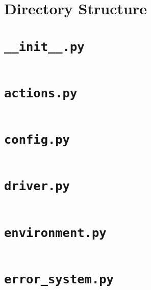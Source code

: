 
\section{Directory Structure}

\cprotect\section{\verb|__init__.py|}\label{code:init}

\inputminted{python}{/Users/valerie/Documents/Sixth-Form/Computer-Science/nea-full-repo/lilac-implementation/lilac/__init__.py}

\cprotect\section{\verb|actions.py|}\label{code:actions}

\inputminted{python}{/Users/valerie/Documents/Sixth-Form/Computer-Science/nea-full-repo/lilac-implementation/lilac/actions.py}

\cprotect\section{\verb|config.py|}\label{code:config}

\inputminted{python}{/Users/valerie/Documents/Sixth-Form/Computer-Science/nea-full-repo/lilac-implementation/lilac/config.py}

\cprotect\section{\verb|driver.py|}\label{code:driver}

\inputminted{python}{/Users/valerie/Documents/Sixth-Form/Computer-Science/nea-full-repo/lilac-implementation/lilac/driver.py}

\cprotect\section{\verb|environment.py|}\label{code:environment}

\inputminted{python}{/Users/valerie/Documents/Sixth-Form/Computer-Science/nea-full-repo/lilac-implementation/lilac/environment.py}

\cprotect\section{\verb|error_system.py|}\label{code:error_system}

